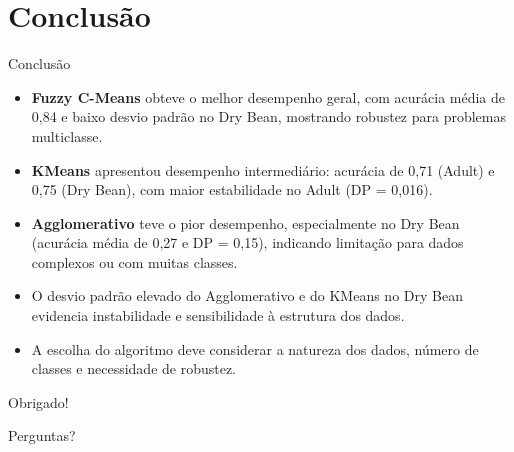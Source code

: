 \documentclass[aspectratio=169]{beamer}
\begin{document}
\section{Conclusão}

\begin{frame}{Conclusão}
\begin{itemize}
    \item \textbf{Fuzzy C-Means} obteve o melhor desempenho geral, com acurácia média de 0,84 e baixo desvio padrão no Dry Bean, mostrando robustez para problemas multiclasse.
    \item \textbf{KMeans} apresentou desempenho intermediário: acurácia de 0,71 (Adult) e 0,75 (Dry Bean), com maior estabilidade no Adult (DP = 0,016).
    \item \textbf{Agglomerativo} teve o pior desempenho, especialmente no Dry Bean (acurácia média de 0,27 e DP = 0,15), indicando limitação para dados complexos ou com muitas classes.
    \item O desvio padrão elevado do Agglomerativo e do KMeans no Dry Bean evidencia instabilidade e sensibilidade à estrutura dos dados.
    \item A escolha do algoritmo deve considerar a natureza dos dados, número de classes e necessidade de robustez.
\end{itemize}
\end{frame}

\begin{frame}
\begin{center}
\Huge Obrigado!
\vspace{1cm}

\Large Perguntas?
\end{center}
\end{frame}
\end{document}
